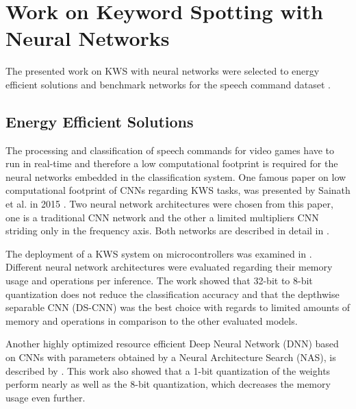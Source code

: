 
\section{Work on Keyword Spotting with Neural Networks}\label{sec:prev_kws}
The presented work on KWS with neural networks were selected to energy efficient solutions and benchmark networks for the speech command dataset \cite{Warden2018}.



\subsection{Energy Efficient Solutions}
The processing and classification of speech commands for video games have to run in real-time and therefore a low computational footprint is required for the neural networks embedded in the classification system.
One famous paper on low computational footprint of CNNs regarding KWS tasks, was presented by Sainath et al. in 2015 \cite{Sainath2015}.
Two neural network architectures were chosen from this paper, one is a traditional CNN network and the other a limited multipliers CNN striding only in the frequency axis.
Both networks are described in detail in .

The deployment of a KWS system on microcontrollers was examined in \cite{Zhang2017}.
Different neural network architectures were evaluated regarding their memory usage and operations per inference.
The work showed that 32-bit to 8-bit quantization does not reduce the classification accuracy and that the depthwise separable CNN (DS-CNN) was the best choice with regards to limited amounts of memory and operations in comparison to the other evaluated models.

Another highly optimized resource efficient Deep Neural Network (DNN) based on CNNs with parameters obtained by a Neural Architecture Search (NAS), is described by \cite{Peter2020}.
This work also showed that a 1-bit quantization of the weights perform nearly as well as the 8-bit quantization, which decreases the memory usage even further.



